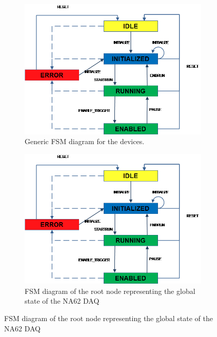 \documentclass[a4paper]{article}
\begin{document}
\begin{figure}[hn]
	\centering
	\begin{subfigure}{0.4\textwidth}
		\includegraphics[width=\textwidth]{Doc/NA62FSM2.png}
		\caption{Generic FSM diagram for the devices.}
		\label{fig:FSM_Device}
	\end{subfigure}
	\begin{subfigure}{0.4\textwidth}
		\includegraphics[width=\textwidth]{Doc/NA62FSM2.png}
		\caption{FSM diagram of the root node representing the global state of the NA62 DAQ}
		\label{fig:FSM_Main}
	\end{subfigure}
\end{figure}
\end{document}
